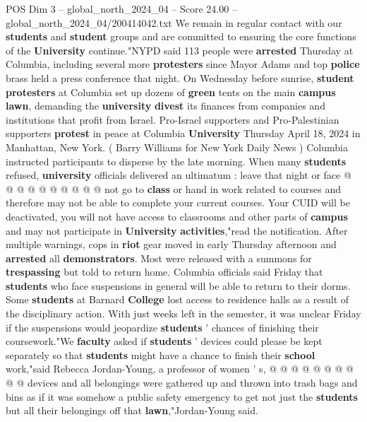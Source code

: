 \begin{textsample}{POS Dim 3 – global\_north\_2024\_04 – Score 24.00 – global\_north\_2024\_04/200414042.txt}
We remain in regular contact with our \textbf{students} and \textbf{student} groups and are committed to ensuring the core functions of the \textbf{University} continue."NYPD said 113 people were \textbf{arrested} Thursday at Columbia, including several more \textbf{protesters} since Mayor Adams and top \textbf{police} brass held a press conference that night.
On Wednesday before sunrise, \textbf{student} \textbf{protesters} at Columbia set up dozens of \textbf{green} tents on the main \textbf{campus} \textbf{lawn}, demanding the \textbf{university} \textbf{divest} its finances from companies and institutions that profit from Israel.
Pro-Israel supporters and Pro-Palestinian supporters \textbf{protest} in peace at Columbia \textbf{University} Thursday April 18, 2024 in Manhattan, New York. ( Barry Williams for New York Daily News ) Columbia instructed participants to disperse by the late morning.
When many \textbf{students} refused, \textbf{university} officials delivered an ultimatum : leave that night or face @ @ @ @ @ @ @ @ @ @ not go to \textbf{class} or hand in work related to courses and therefore may not be able to complete your current courses.
Your CUID will be deactivated, you will not have access to classrooms and other parts of \textbf{campus} and may not participate in \textbf{University} \textbf{activities},"read the notification.
After multiple warnings, cops in \textbf{riot} gear moved in early Thursday afternoon and \textbf{arrested} all \textbf{demonstrators}.
Most were released with a summons for \textbf{trespassing} but told to return home.
Columbia officials said Friday that \textbf{students} who face suspensions in general will be able to return to their dorms.
Some \textbf{students} at Barnard \textbf{College} lost access to residence halls as a result of the disciplinary action.
With just weeks left in the semester, it was unclear Friday if the suspensions would jeopardize \textbf{students} ' chances of finishing their coursework."We \textbf{faculty} asked if \textbf{students} ' devices could please be kept separately so that \textbf{students} might have a chance to finish their \textbf{school} work,"said Rebecca Jordan-Young, a professor of women ' s, @ @ @ @ @ @ @ @ @ @ devices and all belongings were gathered up and thrown into trash bags and bins as if it was somehow a public safety emergency to get not just the \textbf{students} but all their belongings off that \textbf{lawn},"Jordan-Young said.

\end{textsample}
